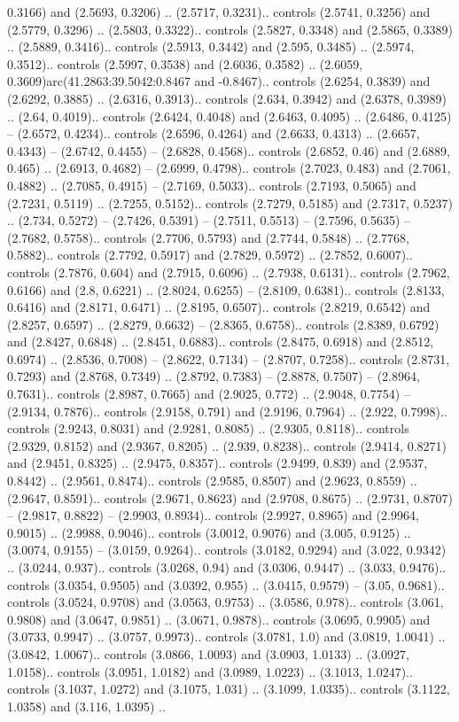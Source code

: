 0.3166) and (2.5693, 0.3206) .. (2.5717, 0.3231).. controls (2.5741, 0.3256) and (2.5779, 0.3296) .. (2.5803, 0.3322).. controls (2.5827, 0.3348) and (2.5865, 0.3389) .. (2.5889, 0.3416).. controls (2.5913, 0.3442) and (2.595, 0.3485) .. (2.5974, 0.3512).. controls (2.5997, 0.3538) and (2.6036, 0.3582) .. (2.6059, 0.3609)arc(41.2863:39.5042:0.8467 and -0.8467).. controls (2.6254, 0.3839) and (2.6292, 0.3885) .. (2.6316, 0.3913).. controls (2.634, 0.3942) and (2.6378, 0.3989) .. (2.64, 0.4019).. controls (2.6424, 0.4048) and (2.6463, 0.4095) .. (2.6486, 0.4125) -- (2.6572, 0.4234).. controls (2.6596, 0.4264) and (2.6633, 0.4313) .. (2.6657, 0.4343) -- (2.6742, 0.4455) -- (2.6828, 0.4568).. controls (2.6852, 0.46) and (2.6889, 0.465) .. (2.6913, 0.4682) -- (2.6999, 0.4798).. controls (2.7023, 0.483) and (2.7061, 0.4882) .. (2.7085, 0.4915) -- (2.7169, 0.5033).. controls (2.7193, 0.5065) and (2.7231, 0.5119) .. (2.7255, 0.5152).. controls (2.7279, 0.5185) and (2.7317, 0.5237) .. (2.734, 0.5272) -- (2.7426, 0.5391) -- (2.7511, 0.5513) -- (2.7596, 0.5635) -- (2.7682, 0.5758).. controls (2.7706, 0.5793) and (2.7744, 0.5848) .. (2.7768, 0.5882).. controls (2.7792, 0.5917) and (2.7829, 0.5972) .. (2.7852, 0.6007).. controls (2.7876, 0.604) and (2.7915, 0.6096) .. (2.7938, 0.6131).. controls (2.7962, 0.6166) and (2.8, 0.6221) .. (2.8024, 0.6255) -- (2.8109, 0.6381).. controls (2.8133, 0.6416) and (2.8171, 0.6471) .. (2.8195, 0.6507).. controls (2.8219, 0.6542) and (2.8257, 0.6597) .. (2.8279, 0.6632) -- (2.8365, 0.6758).. controls (2.8389, 0.6792) and (2.8427, 0.6848) .. (2.8451, 0.6883).. controls (2.8475, 0.6918) and (2.8512, 0.6974) .. (2.8536, 0.7008) -- (2.8622, 0.7134) -- (2.8707, 0.7258).. controls (2.8731, 0.7293) and (2.8768, 0.7349) .. (2.8792, 0.7383) -- (2.8878, 0.7507) -- (2.8964, 0.7631).. controls (2.8987, 0.7665) and (2.9025, 0.772) .. (2.9048, 0.7754) -- (2.9134, 0.7876).. controls (2.9158, 0.791) and (2.9196, 0.7964) .. (2.922, 0.7998).. controls (2.9243, 0.8031) and (2.9281, 0.8085) .. (2.9305, 0.8118).. controls (2.9329, 0.8152) and (2.9367, 0.8205) .. (2.939, 0.8238).. controls (2.9414, 0.8271) and (2.9451, 0.8325) .. (2.9475, 0.8357).. controls (2.9499, 0.839) and (2.9537, 0.8442) .. (2.9561, 0.8474).. controls (2.9585, 0.8507) and (2.9623, 0.8559) .. (2.9647, 0.8591).. controls (2.9671, 0.8623) and (2.9708, 0.8675) .. (2.9731, 0.8707) -- (2.9817, 0.8822) -- (2.9903, 0.8934).. controls (2.9927, 0.8965) and (2.9964, 0.9015) .. (2.9988, 0.9046).. controls (3.0012, 0.9076) and (3.005, 0.9125) .. (3.0074, 0.9155) -- (3.0159, 0.9264).. controls (3.0182, 0.9294) and (3.022, 0.9342) .. (3.0244, 0.937).. controls (3.0268, 0.94) and (3.0306, 0.9447) .. (3.033, 0.9476).. controls (3.0354, 0.9505) and (3.0392, 0.955) .. (3.0415, 0.9579) -- (3.05, 0.9681).. controls (3.0524, 0.9708) and (3.0563, 0.9753) .. (3.0586, 0.978).. controls (3.061, 0.9808) and (3.0647, 0.9851) .. (3.0671, 0.9878).. controls (3.0695, 0.9905) and (3.0733, 0.9947) .. (3.0757, 0.9973).. controls (3.0781, 1.0) and (3.0819, 1.0041) .. (3.0842, 1.0067).. controls (3.0866, 1.0093) and (3.0903, 1.0133) .. (3.0927, 1.0158).. controls (3.0951, 1.0182) and (3.0989, 1.0223) .. (3.1013, 1.0247).. controls (3.1037, 1.0272) and (3.1075, 1.031) .. (3.1099, 1.0335).. controls (3.1122, 1.0358) and (3.116, 1.0395) .. 